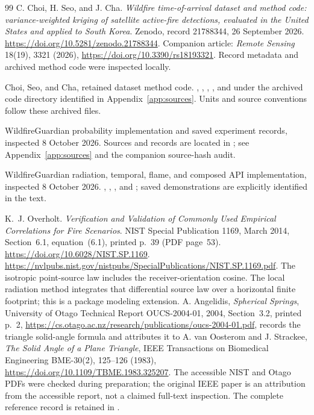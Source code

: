 \documentclass[11pt,a4paper]{article}
\begin{document}
\begin{thebibliography}{99}
C. Choi, H. Seo, and J. Cha.
\emph{Wildfire time-of-arrival dataset and method code: variance-weighted
kriging of satellite active-fire detections, evaluated in the United States
and applied to South Korea}. Zenodo, record 21788344, 26 September 2026.
\url{https://doi.org/10.5281/zenodo.21788344}.
Companion article: \emph{Remote Sensing} 18(19), 3321 (2026),
\url{https://doi.org/10.3390/rs18193321}.
Record metadata and archived method code were inspected locally.

Choi, Seo, and Cha, retained dataset method code.
, , ,
, and  under the archived code
directory identified in Appendix~\ref{app:sources}. Units and source
conventions follow these archived files.

WildfireGuardian probability implementation and saved experiment records,
inspected 8 October 2026. Sources and records are located in
; see
Appendix~\ref{app:sources} and the companion source-hash audit.

WildfireGuardian radiation, temporal, flame, and composed API implementation,
inspected 8 October 2026. ,
, , and ; saved
demonstrations are explicitly identified in the text.

K.~J. Overholt.
\emph{Verification and Validation of Commonly Used Empirical Correlations
for Fire Scenarios}. NIST Special Publication 1169, March 2014,
Section~6.1, equation~(6.1), printed p.~39 (PDF page~53).
\url{https://doi.org/10.6028/NIST.SP.1169}.
\url{https://nvlpubs.nist.gov/nistpubs/SpecialPublications/NIST.SP.1169.pdf}.
The isotropic point-source law includes the receiver-orientation cosine.
The local radiation method integrates that differential source law over a
horizontal finite footprint; this is a package modeling extension.
A. Angelidis, \emph{Spherical Springs}, University of Otago Technical Report
OUCS-2004-01, 2004, Section~3.2, printed p.~2,
\url{https://cs.otago.ac.nz/research/publications/oucs-2004-01.pdf},
records the triangle solid-angle formula and attributes it to A. van Oosterom
and J. Strackee, \emph{The Solid Angle of a Plane Triangle}, IEEE Transactions
on Biomedical Engineering BME-30(2), 125--126 (1983),
\url{https://doi.org/10.1109/TBME.1983.325207}.
The accessible NIST and Otago PDFs were checked during preparation; the
original IEEE paper is an attribution from the accessible report, not a
claimed full-text inspection. The complete reference record is retained in
.



\end{thebibliography}
\end{document}

